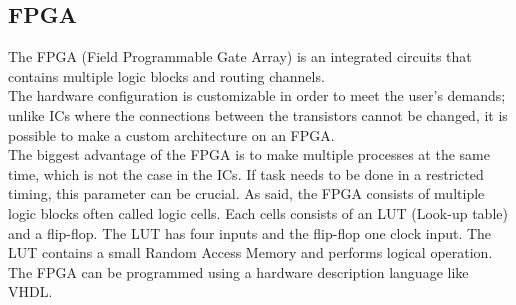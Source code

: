 \subsection{FPGA}


The FPGA (Field Programmable Gate Array) is an integrated circuits that contains multiple logic blocks and routing channels. \\
The hardware configuration is customizable in order to meet the user’s demands; unlike ICs where the connections between the transistors cannot be changed, it is possible to make a custom architecture on an FPGA. \\
The biggest advantage of the FPGA is to make multiple processes at the same time, which is not the case in the ICs. If task needs to be done in a restricted timing, this parameter can be crucial. 
As said, the FPGA consists of multiple logic blocks often called logic cells. Each cells consists of an LUT (Look-up table) and a flip-flop. The LUT has four inputs and the flip-flop one clock input. The LUT contains a small Random Access Memory and performs logical operation. \\


The FPGA can be programmed using a hardware description language like VHDL. \\







